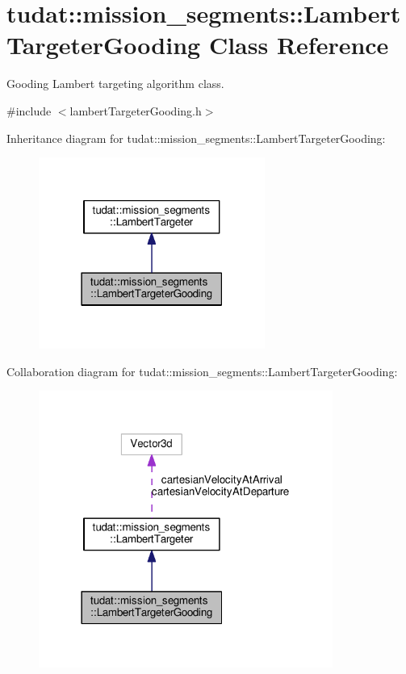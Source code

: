 \hypertarget{classtudat_1_1mission__segments_1_1LambertTargeterGooding}{}\section{tudat\+:\+:mission\+\_\+segments\+:\+:Lambert\+Targeter\+Gooding Class Reference}
\label{classtudat_1_1mission__segments_1_1LambertTargeterGooding}


Gooding Lambert targeting algorithm class.  




{\ttfamily \#include $<$lambert\+Targeter\+Gooding.\+h$>$}



Inheritance diagram for tudat\+:\+:mission\+\_\+segments\+:\+:Lambert\+Targeter\+Gooding\+:
\nopagebreak
\begin{figure}[H]
\begin{center}
\leavevmode
\includegraphics[width=210pt]{classtudat_1_1mission__segments_1_1LambertTargeterGooding__inherit__graph}
\end{center}
\end{figure}


Collaboration diagram for tudat\+:\+:mission\+\_\+segments\+:\+:Lambert\+Targeter\+Gooding\+:
\nopagebreak
\begin{figure}[H]
\begin{center}
\leavevmode
\includegraphics[width=273pt]{classtudat_1_1mission__segments_1_1LambertTargeterGooding__coll__graph}
\end{center}
\end{figure}
